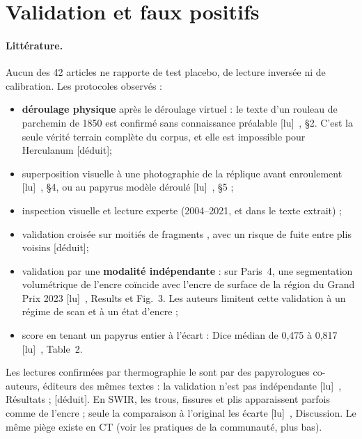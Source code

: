 \documentclass[11pt,a4paper]{article}
\newcommand{\lu}{\textsf{\small[lu]}}
\newcommand{\deduit}{\textsf{\small[déduit]}}
\begin{document}
\section{Validation et faux positifs}
\label{sec:validation}

\paragraph{Littérature.} Aucun des 42 articles ne rapporte de test placebo, de lecture inversée
ni de calibration. Les protocoles observés :
\begin{itemize}
  \item \textbf{déroulage physique} après le déroulage virtuel : le texte d'un rouleau de
  parchemin de 1850 est confirmé sans connaissance préalable \lu~\cite{mills2012}, §2. C'est
  la seule vérité terrain complète du corpus, et elle est impossible pour Herculanum \deduit ;
  \item superposition visuelle à une photographie de la réplique avant enroulement
  \lu~\cite{seales2004}, §4, ou au papyrus modèle déroulé \lu~\cite{allegra2015}, §5 ;
  \item inspection visuelle et lecture experte (2004–2021, et \cite{angelotti2026complete} dans
  le texte extrait) ;
  \item validation croisée sur moitiés de fragments \cite{parsons2023}, avec un risque de
  fuite entre plis voisins \deduit ;
  \item validation par une \textbf{modalité indépendante} : sur Paris~4, une segmentation
  volumétrique de l'encre coïncide avec l'encre de surface de la région du Grand Prix 2023
  \lu~\cite{angelotti2026complete}, Results et Fig.~3. Les auteurs limitent cette validation
  à un régime de scan et à un état d'encre ;
  \item score en tenant un papyrus entier à l'écart : Dice médian de 0,475 à 0,817
  \lu~\cite{angelotti2026topo}, Table~2.
\end{itemize}
Les lectures confirmées par thermographie le sont par des papyrologues co-auteurs, éditeurs
des mêmes textes : la validation n'est pas indépendante \lu~\cite{ceccarelli2025}, Résultats ;
\deduit. En SWIR, les trous, fissures et plis apparaissent parfois comme de l'encre ; seule la
comparaison à l'original les écarte \lu~\cite{tournie2019}, Discussion. Le même piège existe
en CT (voir les pratiques de la communauté, plus bas).
\end{document}
